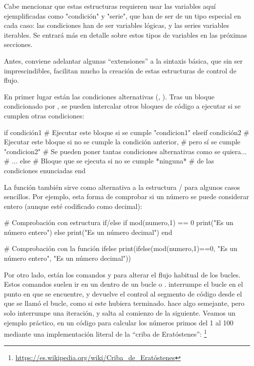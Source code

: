 Cabe mencionar que estas estructuras requieren usar las variables aquí ejemplificadas como "condición" y "serie", que han de ser de un tipo especial en cada caso: las condiciones han de ser variables lógicas, y las series variables iterables. Se entrará más en detalle sobre estos tipos de variables en las próximas secciones.

Antes, conviene adelantar algunas ``extensiones'' a la sintaxis básica, que sin ser imprescindibles, facilitan mucho la creación de estas estructuras de control de flujo.

En primer lugar están las condiciones alternativas (, ). Tras un bloque condicionado por , se pueden intercalar otros bloques de código a ejecutar si se cumplen otras condiciones:

\begin{juliacode}
if condición1
  # Ejecutar este bloque si se cumple "condicion1"
elseif condición2
  # Ejecutar este bloque si no se cumple la condición anterior,
  # pero sí se cumple "condicion2"
  # Se pueden poner tantas condiciones alternativas como se quiera...
  # ...
else
  # Bloque que se ejecuta si no se cumple *ninguna*
  # de las condiciones enunciadas
end
\end{juliacode}

La función  también sirve como alternativa a la estructura / para algunos casos sencillos. Por ejemplo, esta forma de comprobar si un número se puede considerar entero (aunque esté codificado como decimal):

\begin{juliacode}
# Comprobación con estructura if/else
if mod(numero,1) == 0
  print("Es un número entero")
else
  print("Es un número decimal")
end

# Comprobación con la función ifelse
print(ifelse(mod(numero,1)==0, "Es un número entero", "Es un número decimal"))
\end{juliacode}

Por otro lado, están los comandos  y  para alterar el flujo habitual de los bucles. Estos comandos suelen ir en un  dentro de un bucle  o .  interrumpe el bucle en el punto en que se encuentre, y devuelve el control al segmento de código desde el que se llamó el bucle, como si este hubiera terminado.  hace algo semejante, pero solo interrumpe una iteración, y salta al comienzo de la siguiente. Veamos un ejemplo práctico, en un código para calcular los números primos del 1 al 100 mediante una implementación literal de la ``criba de Eratóstenes'':%
\footnote{%
\url{https://es.wikipedia.org/wiki/Criba_de_Eratóstenes}%
}

